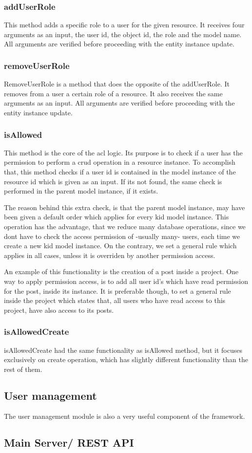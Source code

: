 \subsubsection{addUserRole}
This method adds a specific role to a user for the given resource. It receives four arguments as an input, the user id, the object id, the role and the model name. All arguments are verified before proceeding with the entity instance update.
\subsubsection{removeUserRole}
RemoveUserRole is a method that does the opposite of the addUserRole. It removes from a user a certain role of a resource. It also receives the same arguments as an input. All arguments are verified before proceeding with the entity instance update.
\subsubsection{isAllowed}
This method is the core of the acl logic. Its purpose is to check if  a user has the permission to perform a crud operation in a resource instance. To accomplish that, this method checks if a user id is contained in the model instance of the resource id which is given as an input. If its not found, the same check is performed in the parent model instance, if it exists. \par 
	The reason behind this extra check, is that the parent model instance, may have been given a default order which applies for every kid model instance. This operation has the advantage, that we reduce many database operations, since we dont have to check the access permission of -usually many- users, each time we create a new kid model instance. On the contrary, we set a general rule which applies in all cases, unless it is overriden by another permission access. \par
	An example of this functionality is the creation of a post inside a project. One way to apply permission access, is to add all user id's which have read permission for the post, inside its instance. It is preferable though, to set a general rule inside the project which states that, all users who have read access to this project, have also access to its posts.

\subsubsection{isAllowedCreate}
isAllowedCreate had the same functionality as isAllowed method, but it focuses exclusively on create operation, which has slightly different functionality than the rest of them.

\subsection{User management}
The user management module is also a very useful component of the framework.


\subsection{Main Server/ REST API}
